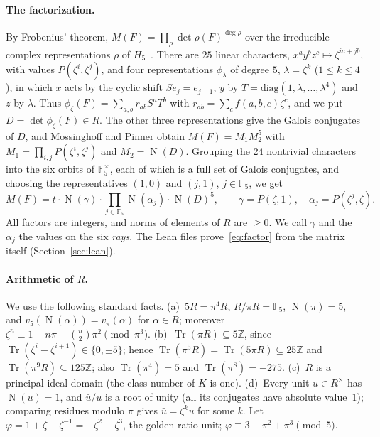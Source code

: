 \documentclass[11pt]{article}
\theoremstyle{definition}
\theoremstyle{remark}
\newcommand{\F}{\mathbb F_5}
\newcommand{\Z}{\mathbb Z}
\newcommand{\Tr}{\operatorname{Tr}}
\newcommand{\N}{\operatorname{N}}
\newcommand{\vp}{v_\pi}
\begin{document}
\paragraph{The factorization.}
By Frobenius' theorem, $M(F)=\prod_\rho\det\rho(F)^{\deg\rho}$ over the
irreducible complex representations $\rho$ of $H_5$~\cite[\S3.1]{mp}. There
are $25$ linear characters, $x^ay^bz^c\mapsto\zeta^{ia+jb}$, with values
$P(\zeta^i,\zeta^j)$, and four representations $\phi_\lambda$ of degree $5$,
$\lambda=\zeta^k$ ($1\le k\le4$), in which $x$ acts by the cyclic shift
$S e_j=e_{j+1}$, $y$ by $T=\mathrm{diag}(1,\lambda,\dots,\lambda^4)$ and $z$
by $\lambda$. Thus $\phi_\zeta(F)=\sum_{a,b}r_{ab}S^aT^b$ with
$r_{ab}=\sum_cf(a,b,c)\zeta^c$, and we put $D=\det\phi_\zeta(F)\in R$. The
other three representations give the Galois conjugates of $D$, and
Mossinghoff and Pinner obtain $M(F)=M_1M_2^5$ with
$M_1=\prod_{i,j}P(\zeta^i,\zeta^j)$ and $M_2=\N(D)$. Grouping the $24$
nontrivial characters into the six orbits of $\F^\times$, each of which is a
full set of Galois conjugates, and choosing the representatives $(1,0)$ and
$(j,1)$, $j\in\F$, we get
\begin{equation}\label{eq:factor}
M(F)=t\cdot\N(\gamma)\cdot\prod_{j\in\F}\N(\alpha_j)\cdot\N(D)^5,
\qquad \gamma=P(\zeta,1),\quad \alpha_j=P(\zeta^j,\zeta).
\end{equation}
All factors are integers, and norms of elements of $R$ are $\ge0$. We call
$\gamma$ and the $\alpha_j$ the values on the six \emph{rays}. The Lean files
prove~\eqref{eq:factor} from the matrix itself (Section~\ref{sec:lean}).

\paragraph{Arithmetic of $R$.} We use the following standard facts. (a)~$5R=\pi^4R$,
$R/\pi R=\F$, $\N(\pi)=5$, and $v_5(\N(\alpha))=\vp(\alpha)$ for
$\alpha\in R$; moreover $\zeta^n\equiv1-n\pi+\binom n2\pi^2\pmod{\pi^3}$.
(b)~$\Tr(\pi R)\subseteq5\Z$, since $\Tr(\zeta^i-\zeta^{i+1})\in\{0,\pm5\}$;
hence $\Tr(\pi^5R)=\Tr(5\pi R)\subseteq25\Z$ and
$\Tr(\pi^9R)\subseteq125\Z$; also $\Tr(\pi^4)=5$ and $\Tr(\pi^8)=-275$.
(c)~$R$ is a principal ideal domain (the class number of $K$ is one). (d)~Every
unit $u\in R^\times$ has $\N(u)=1$, and $\bar u/u$ is a root of unity (all its
conjugates have absolute value~$1$); comparing residues modulo $\pi$ gives
$\bar u=\zeta^ku$ for some $k$. Let $\varphi=1+\zeta+\zeta^{-1}=-\zeta^2-\zeta^3$,
the golden-ratio unit; $\varphi\equiv3+\pi^2+\pi^3\pmod5$.
\end{document}

